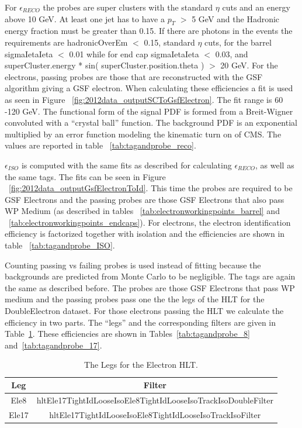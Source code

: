 For $\epsilon_{RECO}$ the probes are super clusters with the standard $\eta$ cuts and an energy above 10 GeV. At least one jet has to have a $p_T$ $>$ 5 GeV and the Hadronic energy fraction must be greater than 0.15. If there are photons in the events the requirements are hadronicOverEm $<$ 0.15, standard $\eta$ cuts, for the barrel sigmaIetaIeta $<$ 0.01 while for end cap sigmaIetaIeta $<$ 0.03, and superCluster.energy * sin( superCluster.position.theta ) $>$ 20 GeV. For the electrons, passing probes are those that are reconstructed with the GSF algorithm giving a GSF electron.  When calculating these efficiencies a fit is used as seen in Figure ~\ref{fig:2012data_outputSCToGsfElectron}.  The fit range is 60 -120 GeV. The functional form of the signal PDF is formed from a Breit-Wigner convoluted with a ``crystal ball'' function. The background PDF is an exponential multiplied by an error function modeling the kinematic turn on of CMS. The values are reported in table ~\ref{tab:tagandprobe_reco}.


$\epsilon_{ISO}$ is computed with the same fits as described for calculating $\epsilon_{RECO}$, as well as the same tags. The fits can be seen in Figure ~\ref{fig:2012data_outputGsfElectronToId}. This time the probes are required to be GSF Electrons and the passing probes are those GSF Electrons that also pass WP Medium (as described in tables ~\ref{tab:electronworkingpoints_barrel} and ~\ref{tab:electronworkingpoints_endcaps}). For electrons, the electron identification efficiency is factorized together with isolation and the efficiencies are shown in table ~\ref{tab:tagandprobe_ISO}.


Counting passing vs failing probes is used instead of fitting because the backgrounds are predicted from Monte Carlo to be negligible. The tags are again the same as described before. The probes are those GSF Electrons that pass WP medium and the passing probes pass one the the legs of the HLT for the DoubleElectron dataset. For those electrons passing the HLT we calculate the efficiency in two parts.  The ``legs'' and the corresponding filters are given in Table~\ref{tab:trigger_stuff}. These efficiencies are shown in Tables~\ref{tab:tagandprobe_8} and~\ref{tab:tagandprobe_17}.




\begin{table}[htb]
\caption{%
The Legs for the Electron HLT.
}
\begin{center}
  \begin{tabular}{ | c | c |} \hline
    Leg & Filter \\ \hline \hline
    Ele8 & hltEle17TightIdLooseIsoEle8TightIdLooseIsoTrackIsoDoubleFilter \\ \hline
    Ele17 & hltEle17TightIdLooseIsoEle8TightIdLooseIsoTrackIsoFilter \\ \hline
  \end{tabular}
\end{center}
\label{tab:trigger_stuff}
\end{table}






